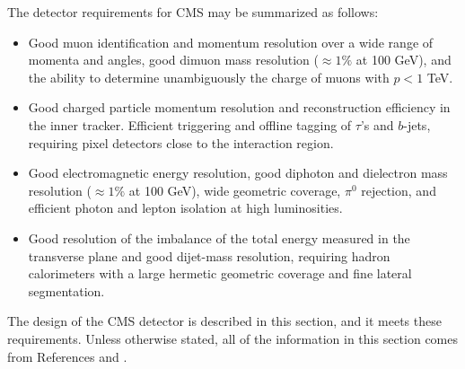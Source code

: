 The detector requirements for CMS may be summarized as follows:
\begin{itemize}
  \item Good muon identification and momentum resolution over
    a wide range of momenta and angles, good dimuon mass resolution
    ($\approx 1\%$ at 100 GeV), and the ability to determine 
    unambiguously the charge of muons with $p < 1$ TeV.
  \item Good charged particle momentum resolution and reconstruction
    efficiency in the inner tracker.  Efficient triggering and offline
    tagging of $\tau$'s and $b$-jets, requiring pixel detectors close
    to the interaction region.
  \item Good electromagnetic energy resolution, good diphoton and dielectron
    mass resolution ($\approx 1\%$ at 100 GeV), wide geometric coverage,
    $\pi^0$ rejection, and efficient photon and lepton isolation at high
    luminosities.
  \item Good resolution of the imbalance of the total energy measured in the transverse plane
    and good dijet-mass resolution, requiring hadron calorimeters with a large hermetic
    geometric coverage and fine lateral segmentation.
\end{itemize}

The design of the CMS detector is described in this section, and it meets these requirements.  
Unless otherwise stated, all of the information in this section comes from References
\cite{cms-jinst} and \cite{cms-tdr}.

